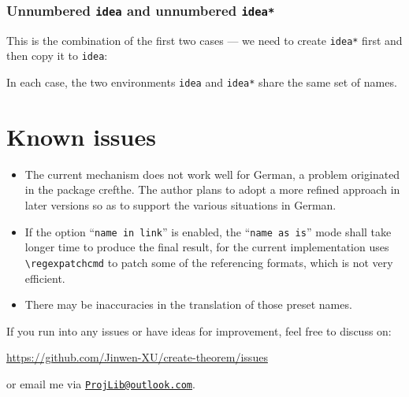 \documentclass[classical]{einfart}
\newcommand{\packageoption}[1]{\texttt{\textcolor{black!67!green}{#1}}}
\newcommand{\commandoption}[1]{\texttt{\textcolor{black!67!cyan}{#1}}}
\begin{document}
\subsubsection{Unnumbered \texttt{idea} and unnumbered \texttt{idea*}}

This is the combination of the first two cases --- we need to create \texttt{idea*} first and then copy it to \texttt{idea}:

\begin{code}
\CreateTheorem{idea}{(*\commandoption{create starred version}*)}
\CreateTheorem{idea}{(*\commandoption{copy existed}*) = idea*}
\end{code}

\smallskip
In each case, the two environments \texttt{idea} and \texttt{idea*} share the same set of names.


\section{Known issues}

\begin{itemize}
    \item The current mechanism does not work well for German, a problem originated in the package \textsf{crefthe}. The author plans to adopt a more refined approach in later versions so as to support the various situations in German.
    \item If the option ``\packageoption{name in link}'' is enabled, the ``\packageoption{name as is}'' mode shall take longer time to produce the final result, for the current implementation uses \lstinline|\regexpatchcmd| to patch some of the referencing formats, which is not very efficient.
    \item There may be inaccuracies in the translation of those preset names.
\end{itemize}

\medskip
If you run into any issues or have ideas for improvement, feel free to discuss on:
\begin{center}
    \url{https://github.com/Jinwen-XU/create-theorem/issues}
\end{center}
or email me via \href{mailto:ProjLib@outlook.com}{\texttt{ProjLib@outlook.com}}.
\end{document}
